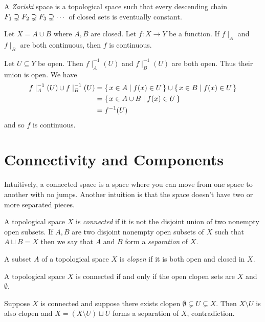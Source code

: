 \documentclass[letterpaper, 11pt, oneside]{book}
\begin{document}
\begin{defn}
  A \emph{Zariski} space is a topological space such that every descending chain $F_{1} \supsetneq F_{2} \supsetneq F_{3} \supsetneq \cdots$ of closed sets is eventually constant.
\end{defn}

\begin{exercise}
  Let $X = A \cup B$ where $A, B$ are closed.
  Let $f\colon X \to Y$ be a function.
  If $f\mid_{A}$ and $f\mid_{B}$ are both continuous, then $f$ is continuous.
\end{exercise}
\begin{pf}
  Let $U \subseteq Y$ be open.
  Then $f\mid_{A}^{-1}(U)$ and $f\mid_{B}^{-1}(U)$ are both open.
  Thus their union is open.
  We have
  \begin{align*}
    f\mid_{A}^{-1}(U) \cup f\mid_{B}^{-1}(U) &= \set{x \in A | f(x) \in U} \cup \set{x \in B | f(x) \in U} \\
                                             &=  \set{x \in A \cup B | f(x) \in U} \\
    &= f^{-1}(U)
  \end{align*}
  and so $f$ is continuous.
\end{pf}

\clearpage

\chapter{Connectivity and Components}

Intuitively, a connected space is a space where you can move from one space to another with no jumps.
Another intuition is that the space doesn't have two or more separated pieces.

\begin{defn}
  A topological space $X$ is \emph{connected} if it is not the disjoint union of two nonempty open subsets.
  If $A, B$ are two disjoint nonempty open subsets of $X$ such that $A \sqcup B = X$ then we say that $A$ and $B$ form a \emph{separation} of $X$.
\end{defn}

\begin{defn}
  A subset $A$ of a topological space $X$ is \emph{clopen} if it is both open and closed in $X$.
\end{defn}

\begin{prop}
  A topological space $X$ is connected if and only if the open clopen sets are $X$ and $\emptyset$.
\end{prop}
\begin{prop}
  Suppose $X$ is connected and suppose there exists clopen $\emptyset \subsetneq U \subsetneq X$.
  Then $X \setminus U$ is also clopen and $X = (X \setminus U) \sqcup U$ forms a separation of $X$, contradiction.
\end{prop}
\end{document}

